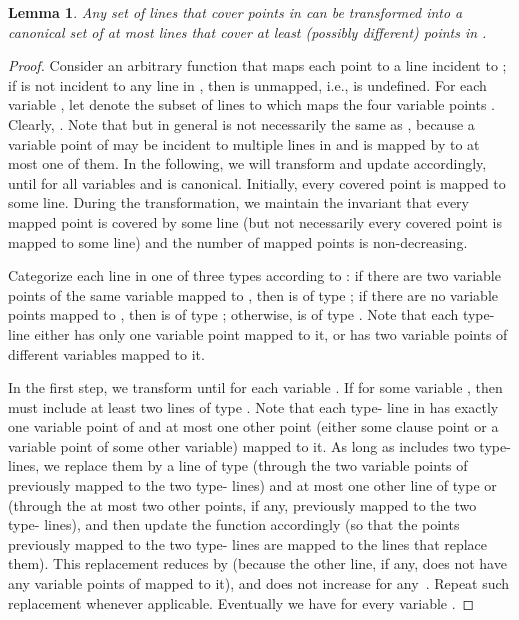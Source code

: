 \documentclass[letterpaper,11pt]{article}
\newtheorem{lemma}{Lemma}
\def\ie{{i.e.}}
\begin{document}
\begin{lemma}\label{lem:canonical}
Any set  of  lines that cover  points in 
can be transformed into a canonical set of at most  lines that
cover at least  (possibly different) points in . 
\end{lemma}
\begin{proof}
Consider an arbitrary function  that maps each point 
to a line  incident to ;
if  is not incident to any line in ,
then  is unmapped, \ie,  is undefined.
For each variable , let  denote the subset of
lines to which  maps the four variable points .
Clearly, .
Note that  but in general  is not necessarily
the same as , because a variable point of  may be incident to
multiple lines in  and is mapped by  to at most one of them.
In the following, we will transform  and update  accordingly,
until  for all variables 
and  is canonical.
Initially, every covered point is mapped to some line.
During the transformation, we maintain the invariant that
every mapped point is covered by some line
(but not necessarily every covered point is mapped to some line)
and the number of mapped points is non-decreasing.

Categorize each line  in one of three types according to :
if there are two variable points of the same variable mapped to ,
then  is of type ;
if there are no variable points mapped to ,
then  is of type ;
otherwise,  is of type .
Note that each type- line either has only one variable point mapped to it,
or has two variable points of different variables mapped to it.

In the first step,
we transform  until  for each variable .
If  for some variable ,
then  must include at least two lines of type .
Note that each type- line in 
has exactly one variable point of  and at most one other point
(either some clause point or a variable point of some other variable)
mapped to it.
As long as  includes two type- lines,
we replace them by a line of type 
(through the two variable points of 
previously mapped to the two type- lines)
and at most one other line of type  or 
(through the at most two other points, if any,
previously mapped to the two type- lines),
and then update the function  accordingly
(so that the points previously mapped to the two type- lines
are mapped to the lines that replace them).
This replacement reduces  by 
(because the other line, if any, does not have any variable points of 
mapped to it), and does not increase  for any~.
Repeat such replacement whenever applicable.
Eventually we have  for every variable .


\end{proof}
\end{document}
